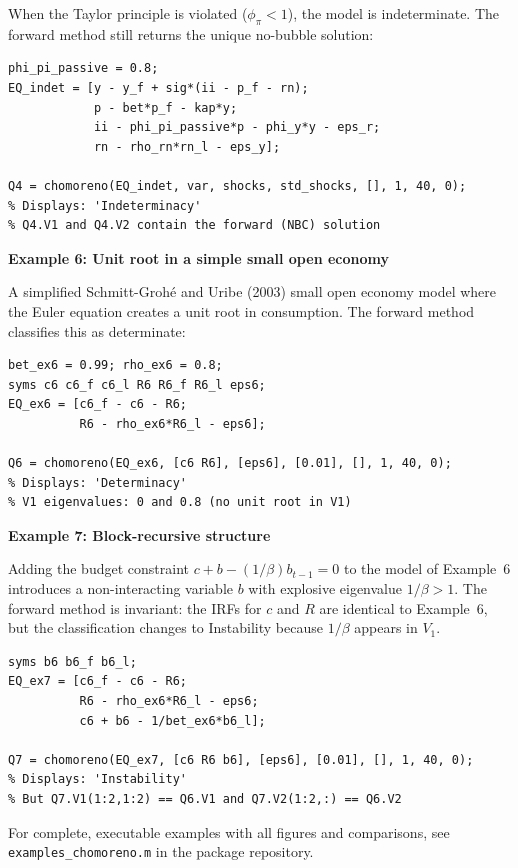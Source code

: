 \documentclass{article}
\begin{document}
\medskip
\noindent When the Taylor principle is violated ($\phi_\pi < 1$), the model is indeterminate. The forward method still returns the unique no-bubble solution:
\begin{verbatim}
phi_pi_passive = 0.8;
EQ_indet = [y - y_f + sig*(ii - p_f - rn);
            p - bet*p_f - kap*y;
            ii - phi_pi_passive*p - phi_y*y - eps_r;
            rn - rho_rn*rn_l - eps_y];

Q4 = chomoreno(EQ_indet, var, shocks, std_shocks, [], 1, 40, 0);
% Displays: 'Indeterminacy'
% Q4.V1 and Q4.V2 contain the forward (NBC) solution
\end{verbatim}

\vspace{1em}
\noindent\textbf{Example 6: Unit root in a simple small open economy}

\medskip
\noindent A simplified Schmitt-Groh\'e and Uribe (2003) small open economy model where the Euler equation creates a unit root in consumption. The forward method classifies this as determinate:
\begin{verbatim}
bet_ex6 = 0.99; rho_ex6 = 0.8;
syms c6 c6_f c6_l R6 R6_f R6_l eps6;
EQ_ex6 = [c6_f - c6 - R6;
          R6 - rho_ex6*R6_l - eps6];

Q6 = chomoreno(EQ_ex6, [c6 R6], [eps6], [0.01], [], 1, 40, 0);
% Displays: 'Determinacy'
% V1 eigenvalues: 0 and 0.8 (no unit root in V1)
\end{verbatim}

\vspace{1em}
\noindent\textbf{Example 7: Block-recursive structure}

\medskip
\noindent Adding the budget constraint $c + b - (1/\beta) b_{t-1} = 0$ to the model of Example~6 introduces a non-interacting variable $b$ with explosive eigenvalue $1/\beta > 1$. The forward method is invariant: the IRFs for $c$ and $R$ are identical to Example~6, but the classification changes to Instability because $1/\beta$ appears in $V_1$.
\begin{verbatim}
syms b6 b6_f b6_l;
EQ_ex7 = [c6_f - c6 - R6;
          R6 - rho_ex6*R6_l - eps6;
          c6 + b6 - 1/bet_ex6*b6_l];

Q7 = chomoreno(EQ_ex7, [c6 R6 b6], [eps6], [0.01], [], 1, 40, 0);
% Displays: 'Instability'
% But Q7.V1(1:2,1:2) == Q6.V1 and Q7.V2(1:2,:) == Q6.V2
\end{verbatim}

\medskip
\noindent For complete, executable examples with all figures and comparisons, see \texttt{examples\_chomoreno.m} in the package repository.
\end{document}
